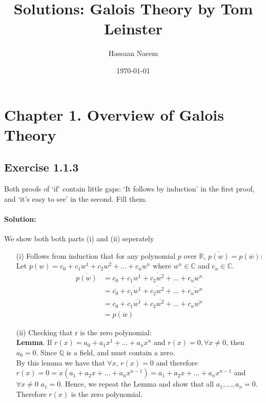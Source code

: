 \documentclass{article}
\title{Solutions: Galois Theory by Tom Leinster}
\author{Hassaan Naeem}
\date{\today}
\begin{document}
\maketitle
\section*{Chapter 1. Overview of Galois Theory}
\subsection*{Exercise 1.1.3} 
Both proofs of ‘if’ contain little gaps: ‘It follows by
induction’ in the first proof, and ‘it’s easy to see’ in the second. Fill
them.\

\paragraph{Solution:} We show both both parts (i) and (ii) seperately

\begin{enumerate}
    \item[(i)] Follows from induction that for any polynomial $p$ over $\mathbb{R}$, $\overline{ p(w)} = p(\overline w)$:\\
        \linebreak 
        Let $p(w) = c_0 + c_1w^1 + c_2w^2 + ... + c_nw^n$ where $w^n \in \mathbb{C}$ and $c_n \in \mathbb{C}$. \\
            \begin{equation*}
                \begin{aligned}
                    \overline{p(w)} & = \overline{c_0 +c_1w^1 + c_2w^2 + ... + c_nw^n}\\
                    & = \overline{c_0} + \overline{c_1w^1} + \overline{c_2w^2} + ... + \overline{c_nw^n}\\
                    & = c_0 + c_1\overline{w^1} + c_2\overline{w^2} + ... + c_n\overline{w^n}\\
                    & = p(\overline w)
                \end{aligned}
            \end{equation*}
    \item[(ii)] Checking that r is the zero polynomial:\\
        \linebreak
        \textbf{Lemma}. If $r(x) = a_0 + a_1x^1+ ... + a_nx^n $ and $r(x) = 0,   \forall x \neq 0 $, then $a_0 = 0$. Since $\mathbb{Q}$ is a field, and must contain a zero.\\
        
        By this lemma we have that $\forall x$, $ r(x) = 0$ and therefore\\
        $r(x) = 0 = x(a_1+ a_2x + ... + a_nx^{n-1}) = a_1+ a_2x + ... + a_nx^{n-1}$ and $\forall x \neq 0$ $a_1 = 0$.
        Hence, we repeat the Lemma and show that all $a_1, ..., a_n = 0$. Therefore $r(x)$ is the zero polynomial.
\end{enumerate}
\end{document}
